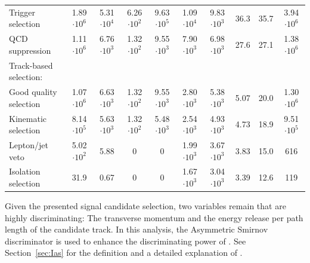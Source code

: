 \begin{table}
{\begin{tabular}{|l|c|c|c|c|c|c|c|c|c|}
Trigger selection                                                                         & 1.89 $\cdot10^{6 }$ & 5.31 $\cdot10^{4 }$ & 6.26 $\cdot10^{2 }$ & 9.63 $\cdot10^{5 }$ & 1.09 $\cdot10^{4 }$ & 9.83 $\cdot10^{3 }$ & 36.3 & 35.7 & 3.94 $\cdot10^{6 }$ \\
QCD suppression                                                                           & 1.11 $\cdot10^{6 }$ & 6.76 $\cdot10^{3 }$ & 1.32 $\cdot10^{2 }$ & 9.55 $\cdot10^{3 }$ & 7.90 $\cdot10^{3 }$ & 6.98 $\cdot10^{3 }$ & 27.6 & 27.1 & 1.38 $\cdot10^{6 }$ \\
Track-based selection:                                                                    
& & & & & & & & & \\
Good quality selection                                                                    & 1.07 $\cdot10^{6 }$ & 6.63 $\cdot10^{3 }$ & 1.32 $\cdot10^{2 }$ & 9.55 $\cdot10^{3 }$ & 2.80 $\cdot10^{3 }$ & 5.38 $\cdot10^{3 }$ & 5.07  & 20.0 & 1.30 $\cdot10^{6 }$ \\
Kinematic selection                                                                       & 8.14 $\cdot10^{5 }$ & 5.63 $\cdot10^{3 }$ & 1.32 $\cdot10^{2 }$ & 5.48 $\cdot10^{3 }$ & 2.54 $\cdot10^{3 }$ & 4.93 $\cdot10^{3 }$ & 4.73  & 18.9 & 9.51 $\cdot10^{5 }$ \\
Lepton/jet veto                                                                           & 5.02 $\cdot10^{2 }$ & 5.88  & 0  & 0  & 1.99 $\cdot10^{3 }$ & 3.67 $\cdot10^{3 }$ & 3.83  & 15.0  & 616 \\
Isolation selection                                                                       & 31.9  & 0.67  & 0  & 0  & 1.67 $\cdot10^{3 }$ & 3.04 $\cdot10^{3 }$ & 3.39  & 12.6  & 119  \\
\bottomrule
\end{tabular}}
\end{table}

Given the presented signal candidate selection, two variables remain that are highly discriminating:
The transverse momentum \pt and the energy release per path length \dedx of the candidate track.
In this analysis, the Asymmetric Smirnov discriminator \ias is used to enhance the discriminating power of \dedx.
See Section~\ref{sec:Ias} for the definition and a detailed explanation of \ias.

